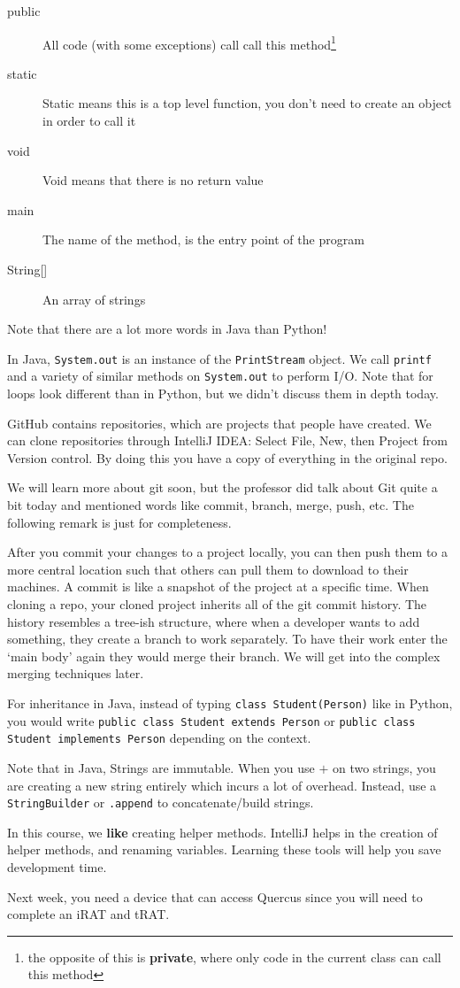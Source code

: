 \begin{description}
    \item[public] All code (with some exceptions) call call this method\footnote{the opposite of this is \textbf{private}, where only code in the current class can call this method}
    \item[static] Static means this is a top level function, you don't need to create an object in order to call it
    \item[void] Void means that there is no return value
    \item[main] The name of the method, is the entry point of the program
    \item[String{[]}] An array of strings
\end{description}

Note that there are a lot more words in Java than Python!

In Java, \texttt{System.out} is an instance of the \texttt{PrintStream} object. We call \texttt{printf} and a variety of similar methods on \texttt{System.out} to perform I/O. Note that for loops look different than in Python, but we didn't discuss them in depth today.

GitHub contains repositories, which are projects that people have created. We can clone repositories through IntelliJ IDEA: Select File, New, then Project from Version control. By doing this you have a copy of everything in the original repo.

We will learn more about git soon, but the professor did talk about Git quite a bit today and mentioned words like commit, branch, merge, push, etc. The following remark is just for completeness.

\begin{remark}[On Git]
After you commit your changes to a project locally, you can then push them to a more central location such that others can pull them to download to their machines. A commit is like a snapshot of the project at a specific time. When cloning a repo, your cloned project inherits all of the git commit history. The history resembles a tree-ish structure, where when a developer wants to add something, they create a branch to work separately. To have their work enter the `main body' again they would merge their branch. We will get into the complex merging techniques later.
\end{remark}

For inheritance in Java, instead of typing \texttt{class Student(Person)} like in Python, you would write \texttt{public class Student extends Person} or \texttt{public class Student implements Person} depending on the context.

Note that in Java, Strings are immutable. When you use $+$ on two strings, you are creating a new string entirely which incurs a lot of overhead. Instead, use a \texttt{StringBuilder} or \texttt{.append} to concatenate/build strings.

In this course, we \textbf{like} creating helper methods. IntelliJ helps in the creation of helper methods, and renaming variables. Learning these tools will help you save development time.

Next week, you need a device that can access Quercus since you will need to complete an iRAT and tRAT.
